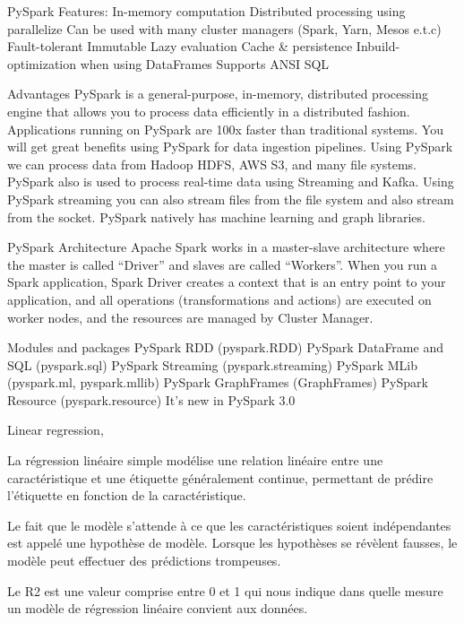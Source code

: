 \documentclass[11pt, onecolumn]{article}
\begin{document}
PySpark Features:
    In-memory computation
    Distributed processing using parallelize
    Can be used with many cluster managers (Spark, Yarn, Mesos e.t.c)
    Fault-tolerant
    Immutable
    Lazy evaluation
    Cache & persistence
    Inbuild-optimization when using DataFrames
    Supports ANSI SQL
    
Advantages
    PySpark is a general-purpose, in-memory, distributed processing engine that allows you to process data efficiently in a distributed fashion.
    Applications running on PySpark are 100x faster than traditional systems.
    You will get great benefits using PySpark for data ingestion pipelines.
    Using PySpark we can process data from Hadoop HDFS, AWS S3, and many file systems.
    PySpark also is used to process real-time data using Streaming and Kafka.
    Using PySpark streaming you can also stream files from the file system and also stream from the socket.
    PySpark natively has machine learning and graph libraries.
    
PySpark Architecture
Apache Spark works in a master-slave architecture where the master is called “Driver” and slaves are called “Workers”. When you run a Spark application, Spark Driver creates a context that is an entry point to your application, and all operations (transformations and actions) are executed on worker nodes, and the resources are managed by Cluster Manager.


Modules and packages
    PySpark RDD (pyspark.RDD)
    PySpark DataFrame and SQL (pyspark.sql)
    PySpark Streaming (pyspark.streaming)
    PySpark MLib (pyspark.ml, pyspark.mllib)
    PySpark GraphFrames (GraphFrames)
    PySpark Resource (pyspark.resource) It’s new in PySpark 3.0
    
    
Linear regression, 

La régression linéaire simple modélise une relation linéaire entre une caractéristique et une étiquette généralement continue, permettant de prédire l'étiquette en fonction de la caractéristique.

Le fait que le modèle s'attende à ce que les caractéristiques soient indépendantes est appelé une hypothèse de modèle. Lorsque les hypothèses se révèlent fausses, le modèle peut effectuer des prédictions trompeuses.

Le R2 est une valeur comprise entre 0 et 1 qui nous indique dans quelle mesure un modèle de régression linéaire convient aux données. 
\end{document}
